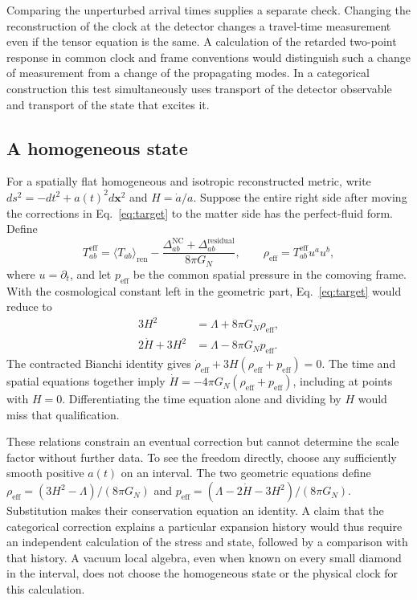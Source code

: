 \documentclass[11pt,letterpaper]{article}
\begin{document}
Comparing the unperturbed arrival times supplies a separate check.
Changing the reconstruction of the clock at the detector changes a
travel-time measurement even if the tensor equation is the same. A
calculation of the retarded two-point response in common clock and
frame conventions would distinguish such a change of measurement from
a change of the propagating modes. In a categorical construction this
test simultaneously uses transport of the detector observable and
transport of the state that excites it.

\subsection{A homogeneous state}
For a spatially flat homogeneous and isotropic reconstructed metric,
write \(ds^2=-dt^2+a(t)^2d\mathbf x^2\) and \(H=\dot a/a\).
Suppose the entire right side after moving the corrections in
Eq.~\eqref{eq:target} to the matter side has the perfect-fluid form.
Define
\[
 T^{\mathrm{eff}}_{ab}=\langle T_{ab}\rangle_{\mathrm{ren}}
   -\frac{\Delta^{\mathrm{NC}}_{ab}+\Delta^{\mathrm{residual}}_{ab}}
          {8\pi G_N},
 \qquad
 \rho_{\mathrm{eff}}=T^{\mathrm{eff}}_{ab}u^a u^b ,
\]
where \(u=\partial_t\), and let \(p_{\mathrm{eff}}\) be the common
spatial pressure in the comoving frame. With the cosmological constant
left in the geometric part, Eq.~\eqref{eq:target} would reduce to
\begin{align}
 3H^2 &= \Lambda+8\pi G_N\rho_{\mathrm{eff}},\\
 2\dot H+3H^2 &= \Lambda-8\pi G_N p_{\mathrm{eff}} .
\end{align}
The contracted Bianchi identity gives
\(\dot\rho_{\mathrm{eff}}+3H(\rho_{\mathrm{eff}}+
p_{\mathrm{eff}})=0\). The time and spatial equations together imply
\(\dot H=-4\pi G_N(\rho_{\mathrm{eff}}+p_{\mathrm{eff}})\), including
at points with \(H=0\). Differentiating the time equation alone and
dividing by \(H\) would miss that qualification.

These relations constrain an eventual correction but cannot determine
the scale factor without further data. To see the freedom directly,
choose any sufficiently smooth positive \(a(t)\) on an interval.
The two geometric equations define
\(\rho_{\mathrm{eff}}=(3H^2-\Lambda)/(8\pi G_N)\) and
\(p_{\mathrm{eff}}=(\Lambda-2\dot H-3H^2)/(8\pi G_N)\).
Substitution makes their conservation equation an identity.
A claim that the categorical correction explains a particular expansion
history would thus require an independent calculation of the stress
and state, followed by a comparison with that history. A vacuum local
algebra, even when known on every small diamond in the interval, does
not choose the homogeneous state or the physical clock for this
calculation.
\end{document}
